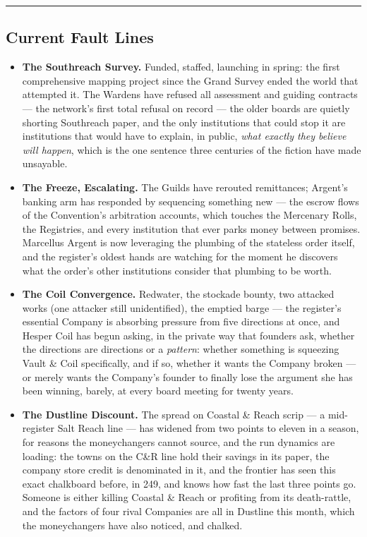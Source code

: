 \medskip\hrule\medskip

\subsection{Current Fault Lines}

\begin{itemize}
    \item \textbf{The Southreach Survey.} Funded, staffed, launching in spring: the first comprehensive mapping project since the Grand Survey ended the world that attempted it. The Wardens have refused all assessment and guiding contracts --- the network's first total refusal on record --- the older boards are quietly shorting Southreach paper, and the only institutions that could stop it are institutions that would have to explain, in public, \textit{what exactly they believe will happen}, which is the one sentence three centuries of the fiction have made unsayable.
    \item \textbf{The Freeze, Escalating.} The Guilds have rerouted remittances; Argent's banking arm has responded by sequencing something new --- the escrow flows of the Convention's arbitration accounts, which touches the Mercenary Rolls, the Registries, and every institution that ever parks money between promises. Marcellus Argent is now leveraging the plumbing of the stateless order itself, and the register's oldest hands are watching for the moment he discovers what the order's other institutions consider that plumbing to be worth.
    \item \textbf{The Coil Convergence.} Redwater, the stockade bounty, two attacked works (one attacker still unidentified), the emptied barge --- the register's essential Company is absorbing pressure from five directions at once, and Hesper Coil has begun asking, in the private way that founders ask, whether the directions are directions or a \textit{pattern}: whether something is squeezing Vault \& Coil specifically, and if so, whether it wants the Company broken --- or merely wants the Company's founder to finally lose the argument she has been winning, barely, at every board meeting for twenty years.
    \item \textbf{The Dustline Discount.} The spread on Coastal \& Reach scrip --- a mid-register Salt Reach line --- has widened from two points to eleven in a season, for reasons the moneychangers cannot source, and the run dynamics are loading: the towns on the C\&R line hold their savings in its paper, the company store credit is denominated in it, and the frontier has seen this exact chalkboard before, in 249, and knows how fast the last three points go. Someone is either killing Coastal \& Reach or profiting from its death-rattle, and the factors of four rival Companies are all in Dustline this month, which the moneychangers have also noticed, and chalked.

\end{itemize}
